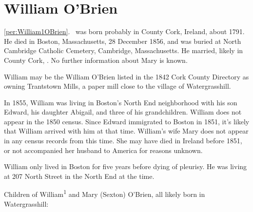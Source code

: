 \section{William O'Brien}

\ref{per:William1OBrien}.\  was born probably in County Cork, Ireland, about 1791.\cite{Census1855William} He died in Boston, Massachusetts, 28 December 1856,\cite{William1OBrienDeath} and was buried at North Cambridge Catholic Cemetery, Cambridge, Massachusetts.\cite{DianaBerberenaLetter1} He married, likely in County Cork, .\cite{Michael2OBrienDeath,Abigail2OBrienDeath,Ann2OBrienDeath,Mary2OBrienDeath} No further information about Mary is known.

William may be the William O'Brien listed in the 1842 Cork County Directory as owning Trantstown Mills, a paper mill close to the village of Watergrasshill.\cite{Jacksons}

In 1855, William was living in Boston's North End neighborhood with his son Edward, his daughter Abigail, and three of his grandchildren.\cite{Census1855William,Wards} William does not appear in the 1850 census. Since Edward immigrated to Boston in 1851,\cite{Edward2OBrienNaturalization} it's likely that William arrived with him at that time. William's wife Mary does not appear in any census records from this time. She may have died in Ireland before 1851, or not accompanied her husband to America for reasons unknown.

William only lived in Boston for five years before dying of pleurisy. He was living at 207 North Street in the North End at the time.\cite{William1OBrienDeath}

\begin{KidsIntro}
	Children of William\textsuperscript{1} and Mary (Sexton) O'Brien, all likely born in Watergrasshill:
\end{KidsIntro}

